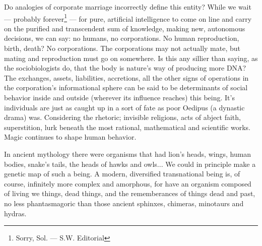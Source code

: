 Do analogies of corporate marriage incorrectly define this entity? While we wait --- 
probably forever\footnote{Sorry, Sol. --- S.W. Editorial} --- for pure, artificial intelligence to come on line and carry on the purified and transcendent sum of knowledge, making
new, autonomous decisions, we can say: no humans, no corporations.
No human reproduction, birth, death? No corporations. The corporations may not
actually mate, but mating and reproduction must go on somewhere. Is this any sillier
than saying, as the sociobiologists do, that the body is nature's way of producing more
DNA? The exchanges, assets, liabilities, accretions, all the other signs of operations
in the corporation's informational sphere
can be said to be determinants of social
behavior inside and outside (wherever its
influence reaches) this being. It's individuals are just as caught up in a sort of fate as
poor Oedipus (a dynastic drama) was. Considering
the rhetoric; invisible religions,
acts of abject faith, superstition, lurk beneath
the most rational, mathematical and scientific works. Magic continues to shape human
behavior.

In ancient mythology there were organisms that had lion's heads, wings, human
bodies, snake's tails, the heads of hawks and
owls... We could in principle make a genetic map
of such a being. A modern, diversified transnational being is, of course,
infinitely more complex and amorphous, for
have an organism composed of living we
things, dead things, and the rememberances
of things dead and past, no less phantasmagoric than those ancient sphinxes, chimeras,
minotaurs and hydras.


